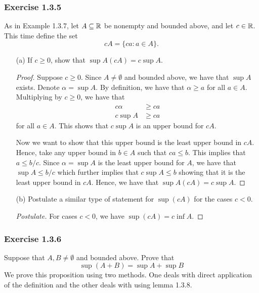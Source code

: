 \subsubsection{Exercise 1.3.5}
As in Example 1.3.7, let \( A \subseteq \mathbb{R} \) be nonempty and bounded above, and let \( c \in \mathbb{R} \). This time define the set 
\[ cA = \{ca: a \in A \}. \]
\begin{enumerate}
    \item[(a)] If \( c \geq 0 \), show that \( \sup A (cA ) = c\sup A \).
    \begin{proof}
        Suppose \( c \geq 0 \). Since \( A \neq \emptyset \) and bounded above, we have that \( \sup A \) exists. Denote \( \alpha = \sup A \). By definition, we have that \( \alpha \geq a \) for all \( a \in A \). Multiplying by \( c \geq 0 \), we have that 
        \begin{align*}
            c\alpha &\geq ca \\ 
            c\sup A &\geq ca
        \end{align*}
        for all \( a \in A \). This shows that \( c \sup A \) is an upper bound for \( cA \).
        
        Now we want to show that this upper bound is the least upper bound in \( cA \). Hence, take any upper bound in \( b \in A \) such that \( ca \leq b \). This implies that \( a \leq b/c \). Since \( \alpha = \sup A \) is the least upper bound for \( A \), we have that \( \sup A \leq b/c \) which further implies that \( c \sup A \leq b \) showing that it is the least upper bound in \( cA \). Hence, we have that 
        \( \sup A (cA ) = c\sup A \).
    \end{proof}
    \item[(b)] Postulate a similar type of statement for \( \sup (cA) \) for the cases \( c < 0 \).
    \begin{proof}[Postulate]
        For cases \( c < 0 \), we have \( \sup (cA ) = c\inf A \).
    \end{proof} 
\end{enumerate}




\subsubsection{Exercise 1.3.6}
Suppose that \( A,B \neq \emptyset \) and bounded above. Prove that 
\[ 
\sup(A+B) = \sup A + \sup B     
\]
We prove this proposition using two methods. One deals with direct application of the definition and the other deals with using lemma 1.3.8. 


